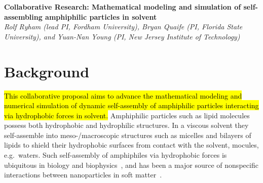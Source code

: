 \noindent
{\bf Collaborative Research: Mathematical modeling and simulation of
self-assembling amphiphilic particles in solvent} \\
{\em Rolf Ryham (lead PI, Fordham University),
Bryan Quaife (PI, Florida State University), and
Yuan-Nan Young (PI, New Jersey Institute of Technology)}

\section{Background}
\label{sec:background}
\hl{This collaborative proposal aims to advance
the mathematical modeling and numerical simulation
of dynamic self-assembly of amphiphilic particles interacting
via hydrophobic forces in solvent.}
Amphiphilic particles such as lipid molecules possess both hydrophobic
and hydrophilic structures. In a viscous solvent they self-assemble into
meso-/macroscopic structures such as micelles and bilayers of lipids to
shield their hydrophobic surfaces from contact with the solvent,
mocules, e.g.~waters. Such self-assembly of amphiphiles via hydrophobic
forces is ubiquitous in biology and biophysics~\cite{Israelachvili1954},
and has been a major source of nonspecific interactions between
nanoparticles in soft matter~\cite{Sanchez-IglesiasEtAl2012_ACSNano,
AltantzisEtAl2013_PSC, XieYangLuEtAl2020_COCIS}. 



